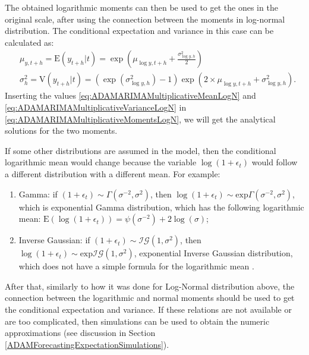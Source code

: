 \documentclass[
]{book}
\providecommand{\tightlist}{%
  \setlength{\itemsep}{0pt}\setlength{\parskip}{0pt}}
\theoremstyle{definition}
\theoremstyle{definition}
\theoremstyle{definition}
\theoremstyle{definition}
\theoremstyle{remark}
\begin{document}
The obtained logarithmic moments can then be used to get the ones in the original scale, after using the connection between the moments in log-normal distribution. The conditional expectation and variance in this case can be calculated as:
\begin{equation}
  \begin{aligned}
    & \mu_{y,t+h} = \mathrm{E}(y_{t+h}|t) = \exp \left(\mu_{\log y,t+h} + \frac{\sigma^2_{\log y,h}}{2} \right) \\
    & \sigma^2_{h} = \mathrm{V}(y_{t+h}|t) = \left(\exp\left( \sigma^2_{\log y,h} \right) -1 \right)\exp\left(2 \times \mu_{\log y,t+h} + \sigma^2_{\log y,h} \right) .
  \end{aligned}
  \label{eq:ADAMARIMAMultiplicativeMomentsLogN}
\end{equation}
Inserting the values \eqref{eq:ADAMARIMAMultiplicativeMeanLogN} and \eqref{eq:ADAMARIMAMultiplicativeVarianceLogN} in \eqref{eq:ADAMARIMAMultiplicativeMomentsLogN}, we will get the analytical solutions for the two moments.

If some other distributions are assumed in the model, then the conditional logarithmic mean would change because the variable \(\log(1+\epsilon_t)\) would follow a different distribution with a different mean. For example:

\begin{enumerate}
\def\labelenumi{\arabic{enumi}.}
\tightlist
\item
  Gamma: if \(\left(1+\epsilon_t \right) \sim \mathcal{\Gamma}(\sigma^{-2}, \sigma^2)\), then \(\log\left(1+\epsilon_t \right) \sim \mathrm{exp}\mathcal{\Gamma}(\sigma^{-2}, \sigma^2)\), which is exponential Gamma distribution, which has the following logarithmic mean: \(\mathrm{E}(\log(1+\epsilon_t)) = \psi\left(\sigma^{-2}\right)+2\log(\sigma)\);
\item
  Inverse Gaussian: if \(\left(1+\epsilon_t \right) \sim \mathcal{IG}(1, \sigma^2)\), then \(\log\left(1+\epsilon_t \right) \sim \mathrm{exp}\mathcal{IG}(1, \sigma^2)\), exponential Inverse Gaussian distribution, which does not have a simple formula for the logarithmic mean \citep[but it can be calculated based on its connection with Generalised \(\mathcal{IG}\) and formulae provided in][]{Sichel1997}.
\end{enumerate}

After that, similarly to how it was done for Log-Normal distribution above, the connection between the logarithmic and normal moments should be used to get the conditional expectation and variance. If these relations are not available or are too complicated, then simulations can be used to obtain the numeric approximations (see discussion in Section \ref{ADAMForecastingExpectationSimulations}).
\end{document}
